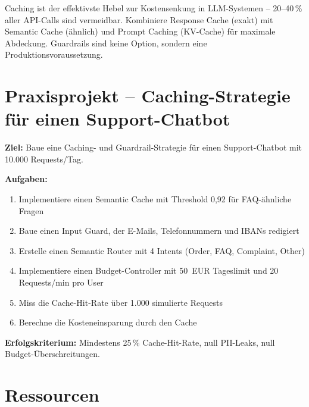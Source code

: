 \begin{merke}
Caching ist der effektivste Hebel zur Kostensenkung in LLM-Systemen -- 20--40\,\% aller API-Calls sind vermeidbar. Kombiniere Response Cache (exakt) mit Semantic Cache (ähnlich) und Prompt Caching (KV-Cache) für maximale Abdeckung. Guardrails sind keine Option, sondern eine Produktionsvoraussetzung.
\end{merke}

\section{Praxisprojekt -- Caching-Strategie für einen Support-Chatbot}

\textbf{Ziel:} Baue eine Caching- und Guardrail-Strategie für einen Support-Chatbot mit 10.000 Requests/Tag.

\textbf{Aufgaben:}
\begin{enumerate}[leftmargin=*]
    \item Implementiere einen Semantic Cache mit Threshold 0,92 für FAQ-ähnliche Fragen
    \item Baue einen Input Guard, der E-Mails, Telefonnummern und IBANs redigiert
    \item Erstelle einen Semantic Router mit 4 Intents (Order, FAQ, Complaint, Other)
    \item Implementiere einen Budget-Controller mit 50~EUR Tageslimit und 20 Requests/min pro User
    \item Miss die Cache-Hit-Rate über 1.000 simulierte Requests
    \item Berechne die Kosteneinsparung durch den Cache
\end{enumerate}

\textbf{Erfolgskriterium:} Mindestens 25\,\% Cache-Hit-Rate, null PII-Leaks, null Budget-Überschreitungen.

\section{Ressourcen}

